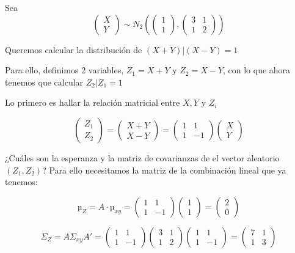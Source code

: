 \begin{example}
Sea \[\begin{pmatrix}X\\Y\end{pmatrix} \sim
N_2\left( \begin{pmatrix}1\\1\end{pmatrix}, \begin{pmatrix} 3&1\\1&2 \end{pmatrix}\right)\]

Queremos calcular la distribución de $(X+Y) | (X-Y) = 1$

Para ello, definimos 2 variables, $Z_1 = X+Y$ y $Z_2 = X-Y$, con lo que ahora tenemos que calcular $Z_2 | Z_1 = 1$

Lo primero es hallar la relación matricial entre $X,Y$ y $Z_i$

\begin{equation*}
	\begin{pmatrix}Z_1 \\ Z_2 \end{pmatrix} = \begin{pmatrix}X+Y\\X-Y\end{pmatrix} = \begin{pmatrix} 1 & 1\\1&-1 \end{pmatrix}\begin{pmatrix}X\\Y\end{pmatrix}
\end{equation*}

¿Cuáles son la esperanza y la matriz de covarianzas de el vector aleatorio $(Z_1,Z_2)$? Para ello necesitamos la matriz de la combinación lineal que ya tenemos:

\[
µ_Z = A·µ_{xy} = \begin{pmatrix}1&1\\1&-1\end{pmatrix} \begin{pmatrix}1\\1\end{pmatrix} = \begin{pmatrix} 2\\0 \end{pmatrix}
\]

\[
Σ_Z = AΣ_{xy}A' = \begin{pmatrix}1&1\\1&-1\end{pmatrix} \begin{pmatrix} 3&1\\1&2 \end{pmatrix}  \begin{pmatrix}1&1\\1&-1\end{pmatrix} = \begin{pmatrix}7&1\\1&3\end{pmatrix}
\]


\end{example}

